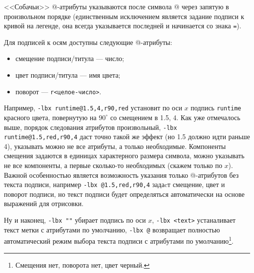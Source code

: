 \documentclass[12pt]{article}
\begin{document}
<<Собачьи>> @-атрибуты указываются после символа @ через запятую в произвольном порядке (единственным исключением является задание подписи к кривой на легенде,
она всегда указывается последней и начинается со знака \verb'='). 

Для подписей к осям доступны следующие @-атрибуты:
\begin{itemize}
\item смещение подписи/титула --- число;
\item цвет подписи/титула --- имя цвета;
\item поворот --- \verb'r<целое-число>'.
\end{itemize}
Например, \verb'-lbx runtime@1.5,4,r90,red' установит по оси $x$ подпись \verb'runtime' красного цвета, повернутую на $90^\circ$ со смещением в 1.5, 4.
Как уже отмечалось выше, порядок следования атрибутов произвольный, \verb'-lbx runtime@1.5,red,r90,4' даст точно такой же эффект (но 1.5 должно идти раньше 4),
указывать можно не все атрибуты, а только необходимые. 
Компоненты смещения задаются в единицах характерного размера символа, можно указывать не все компоненты, а первые сколько-то необходимых (скажем только по $x$).
Важной особенностью является возможность указания только @-атрибутов без текста подписи, например \verb'-lbx @1.5,red,r90,4' задаcт смещение, цвет и поворот
подписи, но текст подписи будет определяться автоматически на основе выражений для отрисовки.

Ну и наконец, \verb'-lbx ""' убирает подпись по оси $x$, \verb'-lbx <text>' устаналивает текст метки с атрибутами по умолчанию, 
\verb'-lbx @' возвращает полностью автоматический режим выбора текста подписи с атрибутами по умолчанию\footnote{Смещения нет, поворота нет, цвет черный.}.
\end{document}
